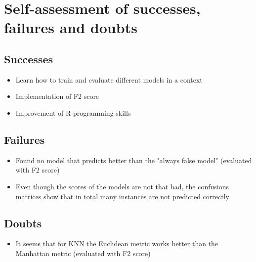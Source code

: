 
\section{Self-assessment of successes, failures and doubts}
\subsection{Successes}
\begin{itemize}
\item{Learn how to train and evaluate different models in a context}
\item{Implementation of F2 score}
\item{Improvement of R programming skills}
\end{itemize}

\subsection{Failures}
\begin{itemize}
\item{Found no model that predicts better than the "always false model" (evaluated with F2 score)}
\item{Even though the scores of the models are not that bad, the confusions matrices show that in total many instances are not predicted correctly}
\end{itemize}

\subsection{Doubts}
\begin{itemize}
\item{It seems that for KNN the Euclidean metric works better than the Manhattan metric (evaluated with F2 score)}
\end{itemize}